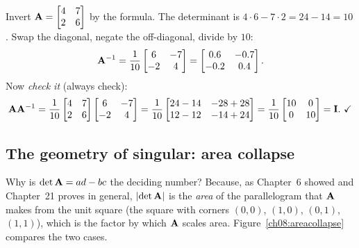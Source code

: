\begin{labbox}
Invert $\mathbf{A} = \begin{bmatrix} 4 & 7 \\ 2 & 6 \end{bmatrix}$ by the formula. The
determinant is $4\cdot6 - 7\cdot2 = 24 - 14 = 10$. Swap the diagonal, negate the
off-diagonal, divide by $10$:
\[
\mathbf{A}^{-1} = \frac{1}{10}\begin{bmatrix} 6 & -7 \\ -2 & 4 \end{bmatrix}
= \begin{bmatrix} 0.6 & -0.7 \\ -0.2 & 0.4 \end{bmatrix}.
\]
Now \emph{check it} (always check):
\[
\mathbf{A}\mathbf{A}^{-1} = \frac{1}{10}\begin{bmatrix} 4 & 7 \\ 2 & 6 \end{bmatrix}
\begin{bmatrix} 6 & -7 \\ -2 & 4 \end{bmatrix}
= \frac{1}{10}\begin{bmatrix} 24-14 & -28+28 \\ 12-12 & -14+24 \end{bmatrix}
= \frac{1}{10}\begin{bmatrix} 10 & 0 \\ 0 & 10 \end{bmatrix} = \mathbf{I}.\ \checkmark
\]
\end{labbox}

\subsection{The geometry of singular: area collapse}

Why is $\det\mathbf{A} = ad - bc$ the deciding number? Because, as Chapter~6 showed and
Chapter~21 proves in general, $\lvert\det\mathbf{A}\rvert$ is the \emph{area} of the parallelogram
that $\mathbf{A}$ makes from the unit square (the square with corners $(0,0)$, $(1,0)$,
$(0,1)$, $(1,1)$), which is the factor by which $\mathbf{A}$ scales area.
Figure~\ref{ch08:areacollapse} compares the two cases.

